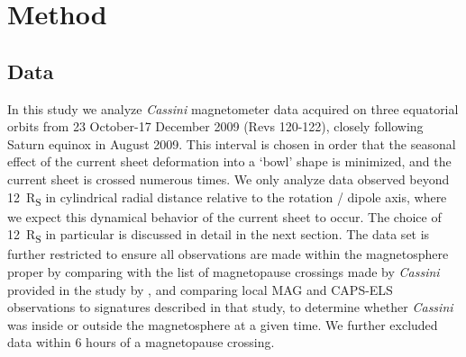 \section{Method}\label{equinox:sec:method}
\subsection{Data}
In this study we analyze \textit{Cassini} magnetometer data acquired on three equatorial orbits from 23 October{\--}17 December 2009 (Revs 120{\--}122), closely following Saturn equinox in August 2009. This interval is chosen in order that the seasonal effect of the current sheet deformation into a `bowl' shape \citep[e.g.][]{arridge2008warp} is minimized, and the current sheet is crossed numerous times. We only analyze data observed beyond \SI{12}{R_S} in cylindrical radial distance relative to the rotation / dipole axis, where we expect this dynamical behavior of the current sheet to occur. The choice of \SI{12}{R_S} in particular is discussed in detail in the next section. The data set is further restricted to ensure all observations are made within the magnetosphere proper by comparing with the list of magnetopause crossings made by \textit{Cassini} provided in the study by \citet{pilkington2015}, and comparing local MAG and CAPS-ELS observations to signatures described in that study, to determine whether \textit{Cassini} was inside or outside the magnetosphere at a given time. We further excluded data within 6 hours of a magnetopause crossing.

